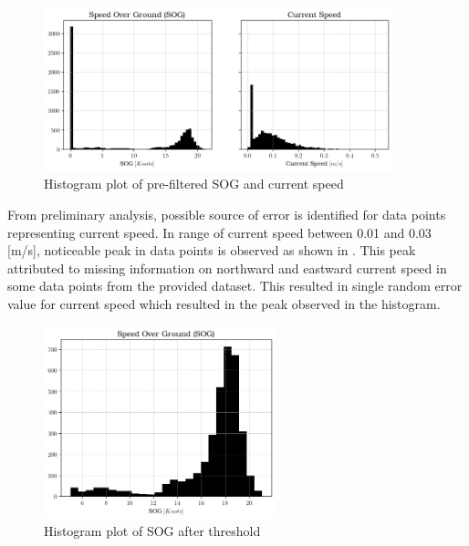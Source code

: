 \begin{figure}[h]
    \centering
        \includegraphics[width=0.9\textwidth]{02_figures/sog_curspeed_anomalies.png}
        \caption{Histogram plot of pre-filtered SOG and current speed}
        \label{fig:anomalies_sog_curspeed}
\end{figure}

From preliminary analysis, possible source of error is identified for data points representing current speed. In range of current speed between 0.01 and 0.03 [m/s], noticeable peak in data points is observed as shown in . This peak attributed to missing information on northward and eastward current speed in some data points from the provided dataset. This resulted in single random error value for current speed which resulted in the peak observed in the histogram.\\ 

\begin{figure}[h]
    \centering
        \includegraphics[width=0.6\textwidth]{02_figures/hist_init_sog_postfilter.png}
        \caption{Histogram plot of SOG after threshold}
        \label{fig:SOG_greater_five}
\end{figure}

